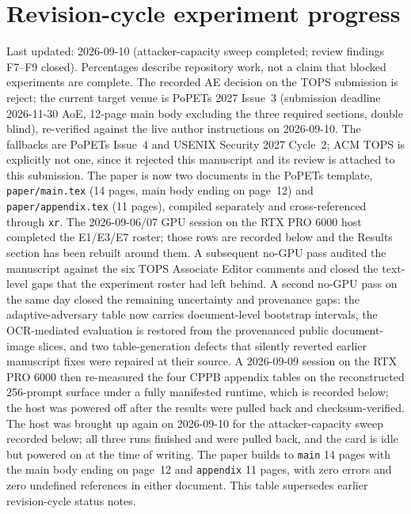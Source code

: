 \documentclass[11pt]{article}
\begin{document}
\section*{Revision-cycle experiment progress}
\noindent
Last updated: 2026-09-10 (attacker-capacity sweep completed; review findings F7--F9 closed).
Percentages describe repository work,
not a claim that blocked experiments are complete. The recorded AE decision on
the TOPS submission is reject; the current target venue is PoPETs 2027 Issue~3
(submission deadline 2026-11-30 AoE, 12-page main body excluding the three
required sections, double blind), re-verified against the live author
instructions on 2026-09-10. The fallbacks are PoPETs Issue~4 and USENIX
Security 2027 Cycle~2; ACM TOPS is explicitly not one, since it rejected this
manuscript and its review is attached to this submission. The paper is now two documents in the PoPETs template, \texttt{paper/main.tex}
(14 pages, main body ending on page~12) and \texttt{paper/appendix.tex}
(11 pages), compiled separately and cross-referenced through \texttt{xr}. The
2026-09-06/07 GPU session on the RTX PRO 6000 host completed the E1/E3/E7
roster; those rows are recorded below and the Results section has been rebuilt
around them. A subsequent no-GPU pass audited the manuscript against the six
TOPS Associate Editor comments and closed the text-level gaps that the
experiment roster had left behind. A second no-GPU pass on the same day closed
the remaining uncertainty and provenance gaps: the adaptive-adversary table now
carries document-level bootstrap intervals, the OCR-mediated evaluation is
restored from the provenanced public document-image slices, and two
table-generation defects that silently reverted earlier manuscript fixes were
repaired at their source. A 2026-09-09 session on the RTX PRO 6000 then re-measured the four CPPB
appendix tables on the reconstructed 256-prompt surface under a fully
manifested runtime, which is recorded below; the host was powered off after the
results were pulled back and checksum-verified. The host was brought up again on
2026-09-10 for the attacker-capacity sweep recorded below; all three runs
finished and were pulled back, and the card is idle but powered on at the time
of writing. The paper builds to \texttt{main} 14 pages with the main body ending
on page~12 and \texttt{appendix} 11 pages, with zero errors and zero undefined
references in either document. This table supersedes earlier
revision-cycle status notes.
\end{document}
